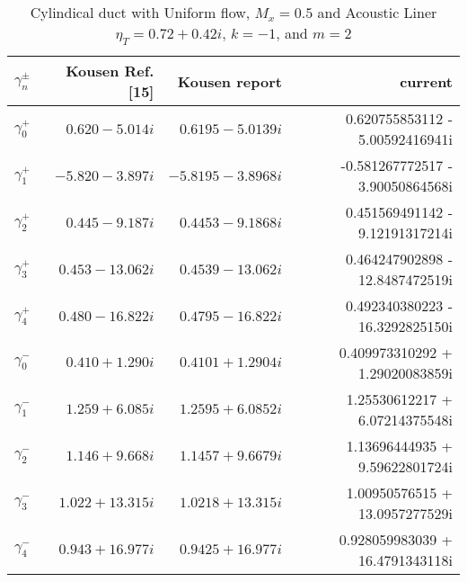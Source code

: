 \begin{table}
 \centering
 \begin{adjustbox}{width=1\textwidth}
     \small
\begin{tabular}{c | r | r | r }
 \hline
 $\gamma^{\pm}_n$ & Kousen Ref. [15] & Kousen report &   current  \\
 \hline
 $\gamma_0^{+}$ & $ 0.620 - 5.014  i $ & $ 0.6195 - 5.0139 i$ & 0.620755853112 - 5.00592416941i  \\
 $\gamma_1^{+}$ & $-5.820 - 3.897  i $ & $-5.8195 - 3.8968 i$ &-0.581267772517 - 3.90050864568i \\
 $\gamma_2^{+}$ & $ 0.445 - 9.187  i $ & $ 0.4453 - 9.1868 i$ &0.451569491142 -  9.12191317214i\\
 $\gamma_3^{+}$ & $ 0.453 - 13.062 i $ & $ 0.4539 - 13.062 i$ &0.464247902898 - 12.8487472519i \\ 
 $\gamma_4^{+}$ & $ 0.480 - 16.822 i $ & $ 0.4795 - 16.822 i$ &0.492340380223 - 16.3292825150i \\
 $\gamma_0^{-}$ & $ 0.410 + 1.290  i $ & $ 0.4101 + 1.2904 i$ &0.409973310292  + 1.29020083859i\\
 $\gamma_1^{-}$ & $ 1.259 + 6.085  i $ & $ 1.2595 + 6.0852 i$ &1.25530612217  + 6.07214375548i \\
 $\gamma_2^{-}$ & $ 1.146 + 9.668  i $ & $ 1.1457 + 9.6679 i$ &1.13696444935  + 9.59622801724i \\
 $\gamma_3^{-}$ & $ 1.022 + 13.315 i $ & $ 1.0218 + 13.315 i$  &1.00950576515 + 13.0957277529i \\
 $\gamma_4^{-}$ & $ 0.943 + 16.977 i $ & $ 0.9425 + 16.977 i$  &0.928059983039 +  16.4791343118i\\ \hline
 \end{tabular}
\end{adjustbox}
\caption{Cylindical duct with Uniform flow, $M_x = 0.5$ and Acoustic Liner $\eta_{T} = 0.72 + 0.42i$, $k = -1$, and $m=2$}
 \label{Table43}
\end{table}

